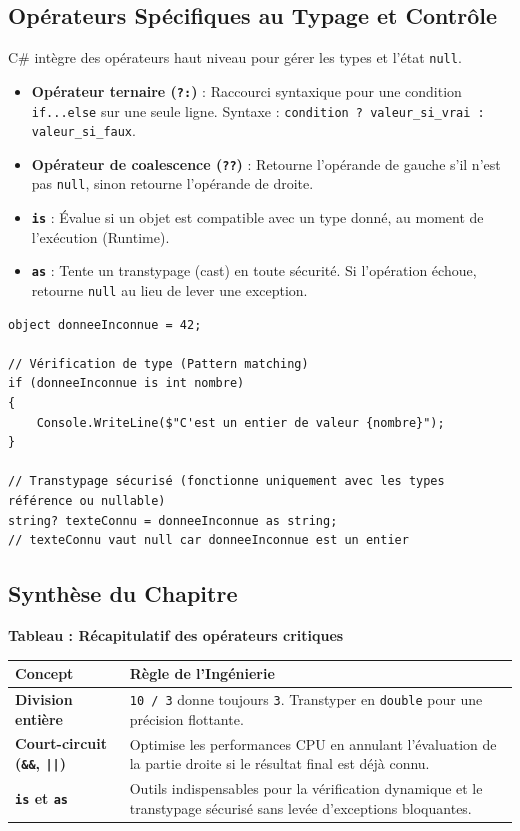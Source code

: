 \subsection{Opérateurs Spécifiques au Typage et Contrôle}

C\# intègre des opérateurs haut niveau pour gérer les types et l'état \texttt{null}.

\begin{itemize}
    \item \textbf{Opérateur ternaire (\texttt{?:})} : Raccourci syntaxique pour une condition \texttt{if...else} sur une seule ligne. Syntaxe : \texttt{condition ? valeur\_si\_vrai : valeur\_si\_faux}.
    \item \textbf{Opérateur de coalescence (\texttt{??})} : Retourne l'opérande de gauche s'il n'est pas \texttt{null}, sinon retourne l'opérande de droite.
    \item \textbf{\texttt{is}} : Évalue si un objet est compatible avec un type donné, au moment de l'exécution (Runtime).
    \item \textbf{\texttt{as}} : Tente un transtypage (cast) en toute sécurité. Si l'opération échoue, retourne \texttt{null} au lieu de lever une exception.
\end{itemize}

\begin{lstlisting}[caption={Utilisation de l'opérateur is et as}]
object donneeInconnue = 42;

// Vérification de type (Pattern matching)
if (donneeInconnue is int nombre) 
{
    Console.WriteLine($"C'est un entier de valeur {nombre}");
}

// Transtypage sécurisé (fonctionne uniquement avec les types référence ou nullable)
string? texteConnu = donneeInconnue as string; 
// texteConnu vaut null car donneeInconnue est un entier
\end{lstlisting}

\subsection{Synthèse du Chapitre}

\begin{center}
    \textbf{Tableau : Récapitulatif des opérateurs critiques} \\[0.3cm]
    \begin{tabular}{@{}lp{10cm}@{}}
        \toprule
        \textbf{Concept} & \textbf{Règle de l'Ingénierie} \\
        \midrule
        \textbf{Division entière} & \texttt{10 / 3} donne toujours \texttt{3}. Transtyper en \texttt{double} pour une précision flottante. \\
        \textbf{Court-circuit (\texttt{\&\&}, \texttt{||})} & Optimise les performances CPU en annulant l'évaluation de la partie droite si le résultat final est déjà connu. \\
        \textbf{\texttt{is} et \texttt{as}} & Outils indispensables pour la vérification dynamique et le transtypage sécurisé sans levée d'exceptions bloquantes. \\
        \bottomrule
    \end{tabular}
\end{center}
